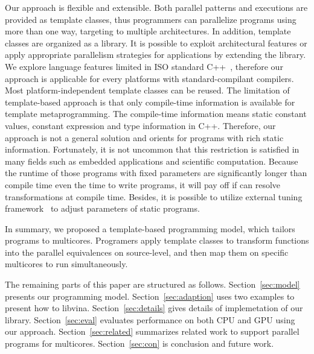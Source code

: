 Our approach is flexible and extensible. Both parallel patterns and
executions are provided as template classes, thus programmers can
parallelize programs using more than one way, targeting to multiple architectures. In addition, template
classes are organized as a library. It is
possible to exploit architectural
features or apply appropriate parallelism strategies for applications
by extending the library. We
explore language features limited in ISO
standard C++~\cite{c++98, c++03, c++0x}, therefore our approach is
applicable for every platforms with standard-compilant compilers. Most 
platform-independent template classes can be reused. The limitation of
template-based approach is that only compile-time
information is available for template metaprogramming. The
compile-time information means static constant values,
constant expression and type information in C++. Therefore, our
approach is not a general solution and orients for programs with rich
static information. Fortunately, it is not uncommon that this
restriction is satisfied in many fields such as embedded applications and
scientific computation. Because the runtime of those programs with fixed
parameters are significantly longer than compile time even the time to
write programs, it will pay off if can resolve transformations at
compile time. Besides, it is possible to utilize external
tuning framework~\cite{tuningfrm} to adjust parameters of static programs.

In summary, we proposed a template-based programming model, which 
tailors programs to multicores. Programers apply template classes to
transform functions into the parallel equivalences on source-level,
and then map them on specific multicores to run simultaneously.

The remaining parts of this paper are structured as follows.
Section~\ref{sec:model} presents our programming model. 
Section~\ref{sec:adaption} uses two examples to present how to libvina. Section~\ref{sec:details} gives details of
implemetation of our library. Section~\ref{sec:eval}
evaluates performance on both CPU and GPU using our approach.
Section~\ref{sec:related} summarizes related work to support parallel programs
for multicores. Section~\ref{sec:con} is conclusion and future work.

